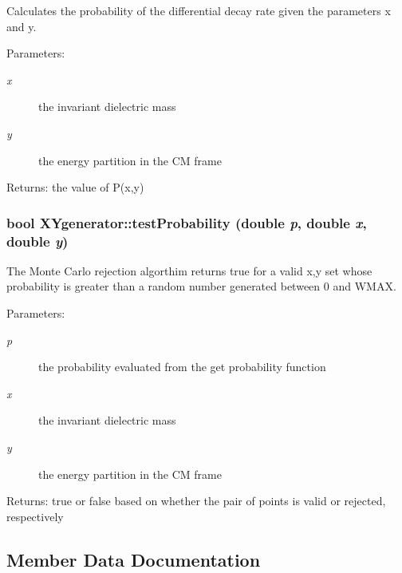 Calculates the probability of the differential decay rate given the parameters x and y. 

\begin{Desc}
\item[Parameters:]
\begin{description}
\item[{\em x}]the invariant dielectric mass \item[{\em y}]the energy partition in the CM frame \end{description}
\end{Desc}
\begin{Desc}
\item[Returns:]the value of P(x,y) \end{Desc}
\subsubsection{\setlength{\rightskip}{0pt plus 5cm}bool XYgenerator::test\-Probability (double {\em p}, double {\em x}, double {\em y})\hspace{0.3cm}{\tt  [private]}}\label{classXYgenerator_61a2db21e12d4325f7fe7f189cfcffa0}


The Monte Carlo rejection algorthim returns true for a valid x,y set whose probability is greater than a random number generated between 0 and WMAX. 

\begin{Desc}
\item[Parameters:]
\begin{description}
\item[{\em p}]the probability evaluated from the get probability function \item[{\em x}]the invariant dielectric mass \item[{\em y}]the energy partition in the CM frame \end{description}
\end{Desc}
\begin{Desc}
\item[Returns:]true or false based on whether the pair of points is valid or rejected, respectively \end{Desc}


\subsection{Member Data Documentation}
